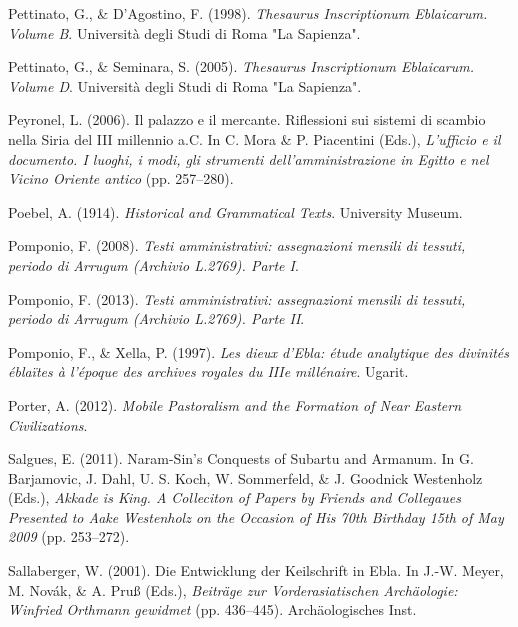\documentclass[
]{book}
\newlength{\cslhangindent}
\newlength{\cslentryspacingunit} %
\newenvironment{CSLReferences}[2] %
 {%
  \setlength{\parindent}{0pt}
  \ifodd #1
  \let\oldpar\par
  \def\par{\hangindent=\cslhangindent\oldpar}
  \fi
  \setlength{\parskip}{#2\cslentryspacingunit}
 }%
 {}
\begin{document}
\begin{CSLReferences}{1}{0}
\leavevmode{}%
Pettinato, G., \& D'Agostino, F. (1998). \emph{Thesaurus Inscriptionum Eblaicarum. Volume B}. Università degli Studi di Roma "La Sapienza".

\leavevmode{}%
Pettinato, G., \& Seminara, S. (2005). \emph{Thesaurus Inscriptionum Eblaicarum. Volume D}. Università degli Studi di Roma "La Sapienza".

\leavevmode{}%
Peyronel, L. (2006). Il palazzo e il mercante. Riflessioni sui sistemi di scambio nella Siria del III millennio a.C. In C. Mora \& P. Piacentini (Eds.), \emph{L'ufficio e il documento. I luoghi, i modi, gli strumenti dell'amministrazione in Egitto e nel Vicino Oriente antico} (pp. 257--280).

\leavevmode{}%
Poebel, A. (1914). \emph{Historical and {Grammatical Texts}}. University Museum.

\leavevmode{}%
Pomponio, F. (2008). \emph{Testi amministrativi: assegnazioni mensili di tessuti, periodo di Arrugum (Archivio L.2769). Parte I}.

\leavevmode{}%
Pomponio, F. (2013). \emph{Testi amministrativi: assegnazioni mensili di tessuti, periodo di Arrugum (Archivio L.2769). Parte II}.

\leavevmode{}%
Pomponio, F., \& Xella, P. (1997). \emph{Les dieux d'Ebla: étude analytique des divinités éblaïtes à l'époque des archives royales du IIIe millénaire}. Ugarit.

\leavevmode{}%
Porter, A. (2012). \emph{Mobile {Pastoralism} and the {Formation} of {Near Eastern Civilizations}}.

\leavevmode{}%
Salgues, E. (2011). Naram-{Sin}'s {Conquests} of {Subartu} and {Armanum}. In G. Barjamovic, J. Dahl, U. S. Koch, W. Sommerfeld, \& J. Goodnick Westenholz (Eds.), \emph{Akkade is {King}. {A Colleciton} of {Papers} by {Friends} and {Collegaues Presented} to {Aake Westenholz} on the {Occasion} of {His} 70th {Birthday} 15th of {May} 2009} (pp. 253--272).

\leavevmode{}%
Sallaberger, W. (2001). Die Entwicklung der Keilschrift in Ebla. In J.-W. Meyer, M. Novák, \& A. Pruß (Eds.), \emph{Beiträge zur Vorderasiatischen Archäologie: Winfried Orthmann gewidmet} (pp. 436--445). Archäologisches Inst.


\end{CSLReferences}
\end{document}
